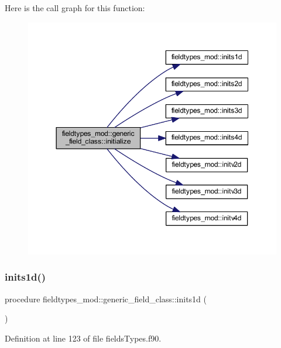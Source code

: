 Here is the call graph for this function\+:\nopagebreak
\begin{figure}[H]
\begin{center}
\leavevmode
\includegraphics[width=350pt]{structfieldtypes__mod_1_1generic__field__class_a0fa61024cf22776788544cf848d767d7_cgraph}
\end{center}
\end{figure}
\mbox{\label{structfieldtypes__mod_1_1generic__field__class_a6a077022127f5450a2e77c034704ad2d}} 
\subsubsection{\texorpdfstring{inits1d()}{inits1d()}}
{\footnotesize\ttfamily procedure fieldtypes\+\_\+mod\+::generic\+\_\+field\+\_\+class\+::inits1d (\begin{DoxyParamCaption}{ }\end{DoxyParamCaption})\hspace{0.3cm}{\ttfamily [private]}}



Definition at line 123 of file fields\+Types.\+f90.

